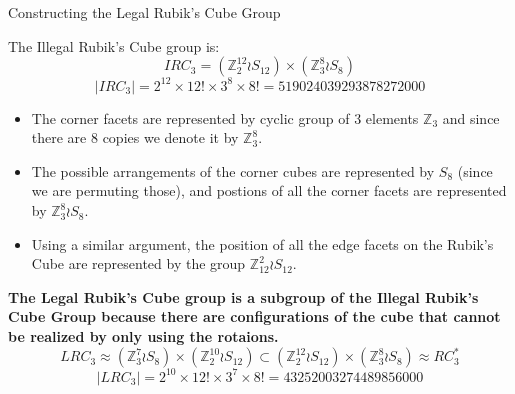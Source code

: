 \documentclass[final]{beamer}
\newlength{\colwidth}
\begin{document}
\begin{frame}[t]
\begin{columns}[t]
\begin{column}{\colwidth}
\begin{block}{Constructing the Legal Rubik's Cube Group}

    The Illegal Rubik's Cube group is:
    $$IRC_{3} = (\mathbb{Z}^{12}_2 \wr S_{12}) \times (\mathbb{Z}^8_3 \wr S_8)$$
    $$|IRC_{3}| = 2^{12} \times 12! \times 3^8 \times 8! = 519024039293878272000$$

\begin{itemize}
\item The corner facets are represented by cyclic group of 3 elements $\mathbb{Z}_{3}$ and since there are $8$ copies we denote it by $\mathbb{Z}_3 ^8$.
\item The possible arrangements of the corner cubes are represented by $S_{8}$ (since we are permuting those), and postions of all the corner facets are represented by $\mathbb{Z}_{3}^{8} \wr S_{8}$.
\item Using a similar argument, the position of all the edge facets on the Rubik's Cube are represented by the group $\mathbb{Z}_{12}^{2} \wr S_{12}$.
\end{itemize}

    \textbf{The Legal Rubik's Cube group is a subgroup of the Illegal Rubik's Cube Group because there are configurations of the cube that cannot be realized by only using the rotaions.}
$$LRC_{3} \approx (\mathbb{Z}_{3}^{7} \wr S_{8}) \times (\mathbb{Z}_{2}^{10} \wr S_{12}) \subset  (\mathbb{Z}^{12}_2 \wr S_{12}) \times (\mathbb{Z}^8_3 \wr S_8) \approx RC^{*}_{3}$$
$$ |LRC_{3}| = 2^{10} \times 12! \times 3^7 \times 8! = 43252003274489856000$$













\end{block}
\end{column}
\end{columns}
\end{frame}
\end{document}
